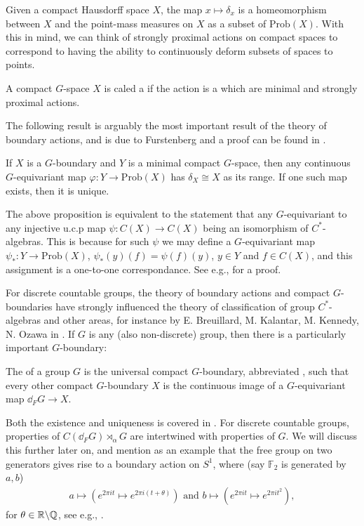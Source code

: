 \begin{note}
	Given a compact Hausdorff space $X$, the map $x \mapsto \delta_x$ is a homeomorphism between $X$ and the point-mass measures on $X$ as a subset of $\mathrm{Prob}(X)$. With this in mind, we can think of strongly proximal actions on compact spaces to correspond to having the ability to continuously deform subsets of spaces to points.
\end{note}
\begin{definition}
	A compact $G$-space $X$ is caled a  if the action is a  which are minimal and strongly proximal actions.
\end{definition}
The following result is arguably the most important result of the theory of boundary actions, and is due to Furstenberg and a proof can be found in \cite[Proposition 4.23]{bscp}.
\begin{proposition}
	If $X$ is a $G$-boundary and $Y$ is a minimal compact $G$-space, then any continuous $G$-equivariant map $\varphi \colon Y \to \mathrm{Prob}(X)$ has $\delta_X \cong X$ as its range. If one such map exists, then it is unique. 
\end{proposition}
\begin{remark}
	The above proposition is equivalent to the statement that any $G$-equivariant to any injective u.c.p map $ \psi \colon C(X)\to C(X)$ being an isomorphism of $C^*$-algebras. This is because for such $\psi$ we may define a $G$-equivariant map $\psi_* \colon Y \to \mathrm{Prob}(X)$, $\psi_*(y)(f)=\psi(f)(y)$, $y \in Y$ and $f \in C(X)$, and this assignment is a one-to-one correspondance. See e.g., \cite[Lemma 4.16 and 4.17]{bscp} for a proof.
\end{remark}
For discrete countable groups, the theory of boundary actions and compact $G$-boundaries have strongly influenced the theory of classification of group $C^*$-algebras and other areas, for instance by E. Breuillard, M. Kalantar, M. Kennedy, N. Ozawa in \cite{breuillard2017c}. If $G$ is any (also non-discrete) group, then there is a particularly important $G$-boundary:
\begin{definition}
	The  of a group $G$ is the universal compact $G$-boundary, abbreviated , such that every other compact $G$-boundary $X$ is the continuous image of a $G$-equivariant map $\dd_F G \to X$.
\end{definition}
Both the existence and uniqueness is covered in \cite[Chapter 4]{bscp}. For discrete countable groups, properties of $C(\dd_F G) \rtimes_\alpha G$ are intertwined with properties of $G$. We will discuss this further later on, and mention as an example that the free group on two generators gives rise to a boundary action on $S^1$, where (say $\mathbb{F}_2$ is generated by $a,b$)
\begin{align*}
	a \mapsto (e^{2 \pi i t} \mapsto e^{2 \pi i (t+\theta)}) \text{  and  } b \mapsto (e^{2 \pi i t} \mapsto e^{2 \pi i t^{2}}),
\end{align*}
for $\theta \in \mathbb{R}\backslash \mathbb{Q}$, see e.g., \cite[Example 4.13]{bscp}.

